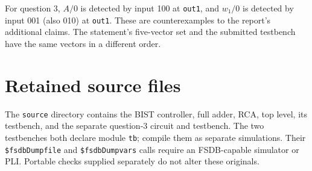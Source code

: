 \documentclass[11pt,a4paper]{article}
\begin{document}
For question 3, $A/0$ is detected by input 100 at \texttt{out1}, and $w_1/0$ is detected by input 001 (also 010) at \texttt{out1}. These are counterexamples to the report's additional claims. The statement's five-vector set and the submitted testbench have the same vectors in a different order.

\section{Retained source files}
The \texttt{source} directory contains the BIST controller, full adder, RCA, top level, its testbench, and the separate question-3 circuit and testbench. The two testbenches both declare module \texttt{tb}; compile them as separate simulations. Their \texttt{\$fsdbDumpfile} and \texttt{\$fsdbDumpvars} calls require an FSDB-capable simulator or PLI. Portable checks supplied separately do not alter these originals.
\end{document}
